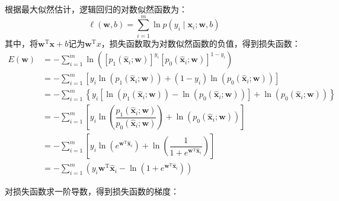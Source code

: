 \documentclass{article}
\begin{document}
根据最大似然估计，逻辑回归的对数似然函数为：
\begin{equation}
    \ell(\boldsymbol{w}, b)=\sum_{i=1}^m \ln p\left(y_i \mid \boldsymbol{x}_i ; \boldsymbol{w}, b\right)
\end{equation}
其中，将$\boldsymbol{w}^{\mathrm{T}} \boldsymbol{x}+b$记为$\mathbf{w}^{\mathrm{T}}x$，损失函数取为对数似然函数的负值，得到损失函数：
\begin{equation*}
    \begin{aligned}
E(\mathbf{w}) & =-\sum_{i=1}^m \ln \left(\left[p_1\left(\hat{\boldsymbol{x}}_i ; \mathbf{w}\right)\right]^{y_i}\left[p_0\left(\hat{\boldsymbol{x}}_i ; \mathbf{w}\right)\right]^{1-y_i}\right) \\
& =-\sum_{i=1}^m\left[y_i \ln \left(p_1\left(\hat{\boldsymbol{x}}_i ; \mathbf{w}\right)\right)+\left(1-y_i\right) \ln \left(p_0\left(\hat{\boldsymbol{x}}_i ; \mathbf{w}\right)\right)\right] \\
& =-\sum_{i=1}^m\left\{y_i\left[\ln \left(p_1\left(\hat{\boldsymbol{x}}_i ; \mathbf{w}\right)\right)-\ln \left(p_0\left(\hat{\boldsymbol{x}}_i ; \mathbf{w}\right)\right)\right]+\ln \left(p_0\left(\hat{\boldsymbol{x}}_i ; \mathbf{w}\right)\right)\right\} \\
& =-\sum_{i=1}^m\left[y_i \ln \left(\dfrac{p_1\left(\hat{\boldsymbol{x}}_i ; \mathbf{w}\right)}{p_0\left(\hat{\boldsymbol{x}}_i ; \mathbf{w}\right)}\right)+\ln \left(p_0\left(\hat{\boldsymbol{x}}_i ; \mathbf{w}\right)\right)\right] \\
& =-\sum_{i=1}^m\left[y_i \ln \left(e^{\mathbf{w}^{\mathrm{T}} \hat{\boldsymbol{x}}_i}\right)+\ln \left(\dfrac{1}{1+e^{\mathbf{w}^{\mathrm{T}} \hat{\boldsymbol{x}}_i}}\right)\right] \\
& =-\sum_{i=1}^m\left(y_i \mathbf{w}^{\mathrm{T}} \hat{\boldsymbol{x}}_i-\ln \left(1+e^{\mathbf{w}^{\mathrm{T}} \hat{\boldsymbol{x}}_i}\right)\right)
\end{aligned}
\end{equation*}

对损失函数求一阶导数，得到损失函数的梯度：
\end{document}

